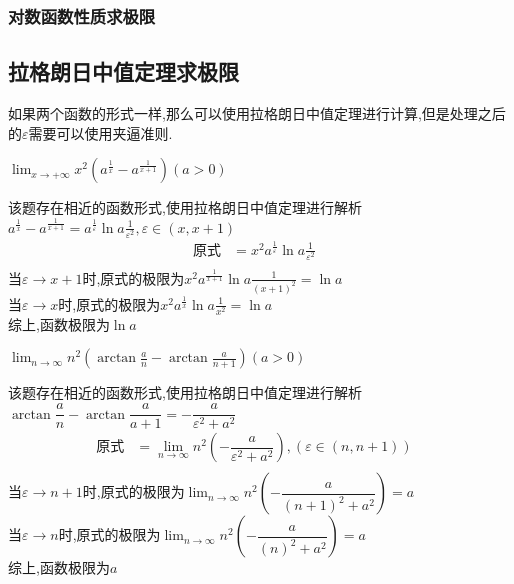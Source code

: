 \documentclass[9pt a4paper, oneside, UTF8]{ctexbook}
\begin{document}
\begin{sloppypar}
    \subsubsection{对数函数性质求极限}
    \subsection{拉格朗日中值定理求极限}
    如果两个函数的形式一样,那么可以使用拉格朗日中值定理进行计算,但是处理之后的$\varepsilon$需要可以使用夹逼准则.
    \begin{problem}
    $\lim_{x\to+\infty}x^{2}\left(a^{\frac{1}{x}}-a^{\frac{1}{x+1}}\right)\left(a>0\right)$        
    \end{problem}
    \begin{solution}
        该题存在相近的函数形式,使用拉格朗日中值定理进行解析$a^{\frac{1}{x}}-a^{\frac{1}{x+1}}=a^{\frac{1}{\varepsilon}}\ln a\frac{1}{\varepsilon ^2},\varepsilon \in (x,x+1)$
        \begin{align*}
            \text{原式} & = x^2 a^{\frac{1}{\varepsilon}}\ln a\frac{1}{\varepsilon ^2} &\\
        \end{align*}
        当$\varepsilon \to x+1$时,原式的极限为$x^2 a^{\frac{1}{x+1}}\ln a \frac{1}{(x+1)^2}=\ln a$\\
        当$\varepsilon \to x$时,原式的极限为$x^2 a^{\frac{1}{x}}\ln a \frac{1}{x^2}=\ln a$\\
        综上,函数极限为$\ln a$
    \end{solution}
    \begin{problem}
        $\lim_{n\to\infty}n^{2}\left(\arctan\frac{a}{n}-\arctan\frac{a}{n+1}\right)\left(a>0\right)$
    \end{problem}
    \begin{solution}
        该题存在相近的函数形式,使用拉格朗日中值定理进行解析$\arctan \dfrac{a}{n}-\arctan \dfrac{a}{a+1}=-\dfrac{a}{ \varepsilon^2 +a^2}$
        \begin{align*}
            \text{原式} & =\lim_{n\to \infty} n^2(-\dfrac{a}{\varepsilon^2+a^2}),(\varepsilon \in (n,n+1) ) &\\
        \end{align*}
        当$\varepsilon \to n+1$时,原式的极限为$\lim_{n\to \infty} n^2(-\dfrac{a}{(n+1)^2+a^2})=a$\\
        当$\varepsilon \to n$时,原式的极限为$\lim_{n\to \infty}n^2(-\dfrac{a}{(n)^2+a^2})=a$\\
        综上,函数极限为$a$
    \end{solution}

\end{sloppypar}
\end{document}
